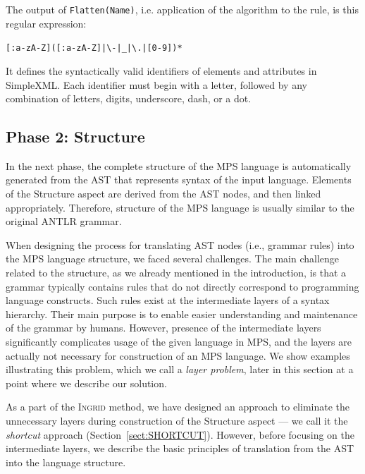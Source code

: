 The output of \texttt{Flatten(Name)}, i.e. application of the algorithm to the  rule, is this regular expression:

\begin{center}
  \texttt{[:a-zA-Z]([:a-zA-Z]|\textbackslash-|{\_}|\textbackslash.|[0-9])*}
\end{center}
It defines the syntactically valid identifiers of elements and attributes in SimpleXML.
Each identifier must begin with a letter, followed by any combination of letters, digits, underscore, dash, or a dot.

\subsection{Phase 2: Structure}

In the next phase, the complete structure of the MPS language is automatically generated from the AST that represents syntax of the input language.
Elements of the Structure aspect are derived from the AST nodes, and then linked appropriately.
Therefore, structure of the MPS language is usually similar to the original ANTLR grammar.

When designing the process for translating AST nodes (i.e., grammar rules) into the MPS language structure, we faced several challenges.
The main challenge related to the structure, as we already mentioned in the introduction, is that a grammar typically contains rules that do not directly correspond to programming language constructs.
Such rules exist at the intermediate layers of a syntax hierarchy.
Their main purpose is to enable easier understanding and maintenance of the grammar by humans.
However, presence of the intermediate layers significantly complicates usage of the given language in MPS, and the layers are actually not necessary for construction of an MPS language.
We show examples illustrating this problem, which we call a \emph{layer problem}, later in this section at a point where we describe our solution.

As a part of the \textsc{Ingrid} method, we have designed an approach to eliminate the unnecessary layers during construction of the Structure aspect --- we call it the \emph{shortcut} approach (Section~\ref{sect:SHORTCUT}).
However, before focusing on the intermediate layers, we describe the basic principles of translation from the AST into the language structure.

